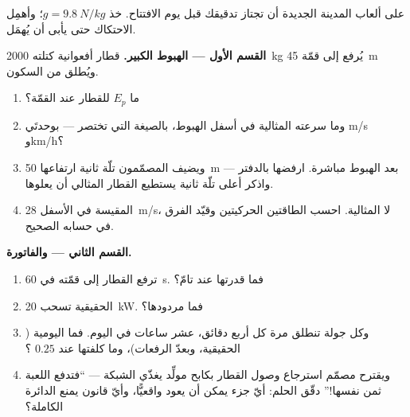 \begin{problem}\label{pb:g9:energy-conversions:1}
على ألعاب المدينة الجديدة أن تجتاز تدقيقك  قبل يوم
الافتتاح. خذ $g = \qty{9.8}{N/kg}$؛ وأهمِل الاحتكاك حتى يأبى
أن يُهمَل.

\medskip\noindent\textbf{القسم الأول --- الهبوط الكبير.}
قطار أفعوانية كتلته \qty{2000}{kg} يُرفع  إلى قمّة
\qty{45}{m} ويُطلق من السكون.
\begin{enumerate}
  \item ما $E_p$ للقطار عند القمّة؟
  \item وما سرعته المثالية في أسفل الهبوط، بالصيغة التي
        تختصر  --- بوحدتَي \unit{m/s} و\unit{km/h}؟
  \item ويضيف المصمّمون تلّة ثانية ارتفاعها \qty{50}{m} بعد
        الهبوط مباشرة. ارفضها بالدفتر --- واذكر أعلى تلّة
        ثانية يستطيع القطار المثالي أن يعلوها.
  \item {} المقيسة في الأسفل \qty{28}{m/s}، لا
        المثالية. احسب الطاقتين الحركيتين وقيّد الفرق في
        حسابه الصحيح.
\end{enumerate}

\medskip\noindent\textbf{القسم الثاني --- 
والفاتورة.}
\begin{enumerate}[resume]
  \item ترفع  القطار إلى قمّته في \qty{60}{s}. فما
        قدرتها عند  تامّ؟
  \item {} الحقيقية تسحب \qty{20}{kW}. فما مردودها؟
  \item وكل جولة تنطلق مرة كل أربع دقائق، عشر ساعات في
        اليوم. فما   اليومية 
        ( الحقيقية، وبعدّ الرفعات)، وما كلفتها عند
        $0.25$ ؟
  \item ويقترح مصمّم استرجاع  وصول القطار بكابح مولِّد
        يغذّي الشبكة --- ``فتدفع اللعبة ثمن نفسها!'' دقّق
        الحلم: أيّ جزء يمكن أن يعود واقعيًّا، وأيّ قانون يمنع
        الدائرة الكاملة؟
\end{enumerate}


\end{problem}
